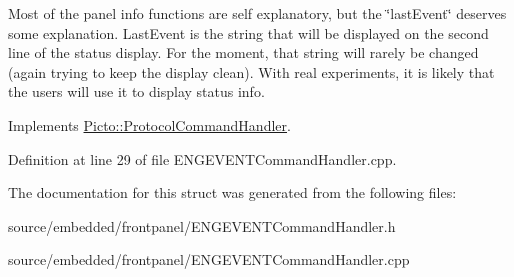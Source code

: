 Most of the panel info functions are self explanatory, but the \char`\"{}last\-Event\char`\"{} deserves some explanation. Last\-Event is the string that will be displayed on the second line of the status display. For the moment, that string will rarely be changed (again trying to keep the display clean). With real experiments, it is likely that the users will use it to display status info. 

Implements \hyperlink{struct_picto_1_1_protocol_command_handler_aeeaa16fe40f10fd55996d74e16e29cad}{Picto\-::\-Protocol\-Command\-Handler}.



Definition at line 29 of file E\-N\-G\-E\-V\-E\-N\-T\-Command\-Handler.\-cpp.



The documentation for this struct was generated from the following files\-:\begin{DoxyCompactItemize}
\item 
source/embedded/frontpanel/E\-N\-G\-E\-V\-E\-N\-T\-Command\-Handler.\-h\item 
source/embedded/frontpanel/E\-N\-G\-E\-V\-E\-N\-T\-Command\-Handler.\-cpp\end{DoxyCompactItemize}
